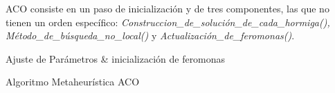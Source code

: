 ACO consiste en un paso de inicializaci\'on y de tres componentes, las que no tienen un orden espec\'ifico: {\it Construccion\_de\_soluci\'on\_de\_cada\_hormiga(),  M\'etodo\_de\_b\'usqueda\_no\_local()} y {\it Actualizaci\'on\_de\_feromonas()}.


\begin{algorithm}[H]
\SetAlgoLined
{}
 Ajuste de Par\'ametros \& inicializaci\'on de feromonas \;
 \caption{Algoritmo Metaheur\'istica ACO}\label{ACO-Algo}
\end{algorithm}


